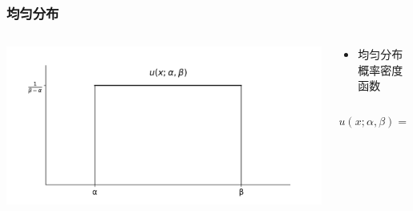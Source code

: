 \documentclass[serif,aspectratio=169]{beamer}
\begin{document}
\begin{frame}
  \frametitle{均匀分布}
  \begin{columns}
    \begin{column}{.5\textwidth}
      \includegraphics[width=\textwidth]{img/uniform.png}
    \end{column}
    \begin{column}{.5\textwidth}
      \begin{itemize}
      \item 均匀分布概率密度函数
      \end{itemize}
      
      $$u(x;\alpha,\beta) = \left\{\begin{array}{cl}\frac{1}{\beta-\alpha}&\textrm{for }\alpha<x<\beta\\0&\mathrm{elsewhere}\end{array}\right.$$
      
    \end{column}
  \end{columns}
 \end{frame}
\end{document}
